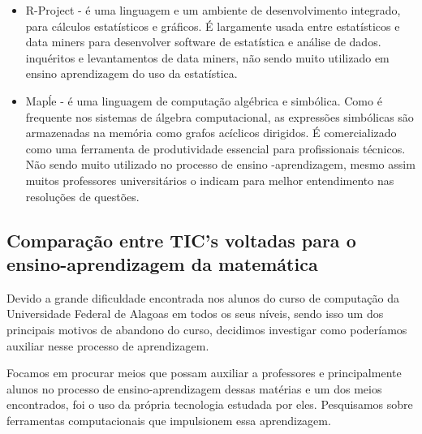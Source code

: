 \documentclass[12pt,a4paper]{article}
\begin{document}
\begin{itemize}
\item R-Project - é uma linguagem e um ambiente de desenvolvimento integrado, para cálculos estatísticos e gráficos. É largamente usada entre estatísticos e data miners para desenvolver software de estatística e análise de dados. inquéritos e levantamentos de data miners, não sendo muito utilizado em ensino aprendizagem do uso da estatística.

\item Mapĺe - é uma linguagem de computação algébrica e simbólica. Como é frequente nos sistemas de álgebra computacional, as expressões simbólicas são armazenadas na memória como grafos acíclicos dirigidos. É comercializado como uma ferramenta de produtividade essencial para profissionais técnicos. Não sendo muito utilizado no processo de ensino -aprendizagem, mesmo assim muitos professores universitários o indicam para melhor entendimento nas resoluções de questões.
\end{itemize}

\subsection{Comparação entre TIC’s voltadas para o ensino-aprendizagem da matemática}
 
Devido a grande dificuldade encontrada nos alunos do curso de computação da Universidade Federal de Alagoas em todos os seus níveis, sendo isso um dos principais motivos de abandono do curso, decidimos investigar como poderíamos auxiliar nesse processo de aprendizagem.

Focamos em procurar meios que possam auxiliar a professores e principalmente alunos no processo de ensino-aprendizagem dessas matérias e um dos meios encontrados, foi o uso da própria tecnologia estudada por eles. Pesquisamos sobre ferramentas computacionais que impulsionem essa aprendizagem.
\end{document}
